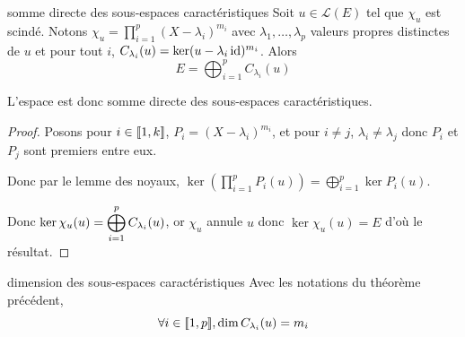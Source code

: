 \begin{theoreme}{somme directe des sous-espaces caractéristiques}{}
    Soit $u \in \mathscr L(E)$ tel que $\chi_u$ est scindé. Notons 
    $\chi_u = \displaystyle \prod_{i = 1 }^{ p } (X - \lambda_i)^{m_i}$ avec 
    $\lambda_1, \ldots, \lambda_p$ valeurs propres distinctes de $u$
    et pour tout $i$, $C_{\lambda_i}(u) = \ker (u - \lambda_i \operatorname{id})^{m_i}$.
    Alors $$E = \displaystyle \bigoplus_{i = 1 }^{ p } C_{\lambda_i}(u)$$

    L'espace est donc somme directe des sous-espaces caractéristiques.
\end{theoreme}


\begin{proof}
    Posons pour $i \in [\![1, k]\!] $, $P_i = (X - \lambda_i)^{m_i}$, et
    pour $i \neq j$, $\lambda_i \neq \lambda_j$ donc $P_i$ et $P_j$ sont premiers entre eux.

    Donc par le lemme des noyaux, $\displaystyle \ker \left(\prod_{i = 1 }^{ p } P_i(u) \right) = \bigoplus_{i = 1 }^{ p } \ker P_i(u)$.
    
    Donc $\displaystyle \ker \chi_u(u) = \bigoplus_{i = 1 }^{ p } C_{\lambda_i}(u)$, or $\chi_u$ annule $u$ donc 
    $\ker \chi_u(u) = E$ d'où le résultat.

\end{proof}

\begin{corollaire}{dimension des sous-espaces caractéristiques}{}
    Avec les notations du théorème précédent, $$\forall i \in [\![1, p]\!], 
    \dim C_{\lambda_i}(u) = m_i$$
\end{corollaire}

